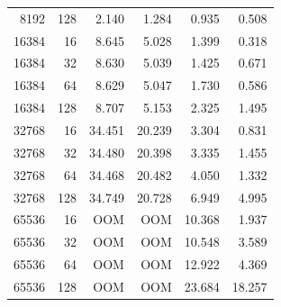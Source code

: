 \documentclass[11pt]{article}
\begin{document}
\begin{table}[H]
\begin{tabular}{rrrrrr}
8192 & 128 & 2.140 & 1.284 & 0.935 & 0.508 \\
16384 & 16 & 8.645 & 5.028 & 1.399 & 0.318 \\
16384 & 32 & 8.630 & 5.039 & 1.425 & 0.671 \\
16384 & 64 & 8.629 & 5.047 & 1.730 & 0.586 \\
16384 & 128 & 8.707 & 5.153 & 2.325 & 1.495 \\
32768 & 16 & 34.451 & 20.239 & 3.304 & 0.831 \\
32768 & 32 & 34.480 & 20.398 & 3.335 & 1.455 \\
32768 & 64 & 34.468 & 20.482 & 4.050 & 1.332 \\
32768 & 128 & 34.749 & 20.728 & 6.949 & 4.995 \\
65536 & 16 & OOM & OOM & 10.368 & 1.937 \\
65536 & 32 & OOM & OOM & 10.548 & 3.589 \\
65536 & 64 & OOM & OOM & 12.922 & 4.369 \\
65536 & 128 & OOM & OOM & 23.684 & 18.257 \\
\bottomrule
\end{tabular}
\end{table}
\end{document}
